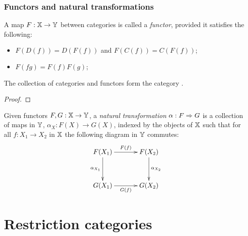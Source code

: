 \subsubsection{Functors and natural transformations} %
\label{ssub:functors_and_natural_transformations}

\begin{definition}\label{def:functor}
  A map $F:\mathbb{X} \to \mathbb{Y}$ between categories is called a \emph{functor}, provided it satisfies the following:
  \begin{itemize}
    \item[\axiom{F}{1}] $F(D(f)) = D(F(f))$ and $F(C(f)) = C(F(f))$;
    \item[\axiom{F}{2}] $F(f g) = F(f)F(g)$;
  \end{itemize}
\end{definition}

\begin{lemma}\label{lem:cat_is_a_category}
  The collection of categories and functors form the category \cat.
\end{lemma}
\begin{proof}
\end{proof}

\begin{definition}\label{def:natural_transformation}
  Given functors $F,G:\mathbb{X} \to \mathbb{Y}$, a \emph{natural transformation} $\alpha:F \Rightarrow G$ is a collection
  of maps in $\mathbb{Y}$, $\alpha_X : F(X) \to G(X)$, indexed by the objects of $\mathbb{X}$ such that for all
  $f:X_1 \to X_2$ in $\mathbb{X}$ the following diagram in $\mathbb{Y}$ commutes:
  \[\xymatrix @R+10pt @C+10pt{
      F(X_1) \ar[r]^{F(f)} \ar[d]_{\alpha_{X_1}} & F(X_2) \ar[d]^{\alpha_{X_2}}\\
      G(X_1) \ar[r]_{G(f)} &  G(X_2)
    }
  \]
\end{definition}


\section{Restriction categories} %
\label{sec:restriction_categories}


